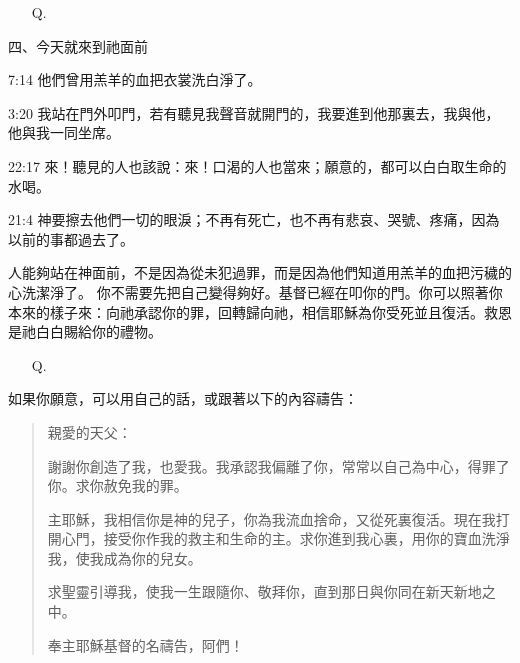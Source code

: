 \begin{center}
\begin{tcolorbox}
\begin{itemize}[leftmargin=2em, labelsep=0.3em]
\item[Q.] 
\end{itemize}

\vspace{0.3cm}
四、今天就來到祂面前

\begin{ScriptureBox}
\item[7:14] 他們曾用羔羊的血把衣裳洗白淨了。
\item[3:20] 我站在門外叩門，若有聽見我聲音就開門的，我要進到他那裏去，我與他，他與我一同坐席。
\item[22:17] 來！聽見的人也該說：來！口渴的人也當來；願意的，都可以白白取生命的水喝。
\item[21:4] 神要擦去他們一切的眼淚；不再有死亡，也不再有悲哀、哭號、疼痛，因為以前的事都過去了。
\end{ScriptureBox}

人能夠站在神面前，不是因為從未犯過罪，而是因為他們知道用羔羊的血把污穢的心洗潔淨了。
你不需要先把自己變得夠好。基督已經在叩你的門。你可以照著你本來的樣子來：向祂承認你的罪，回轉歸向祂，相信耶穌為你受死並且復活。救恩是祂白白賜給你的禮物。

\begin{itemize}[leftmargin=2em, labelsep=0.3em]
\item[Q.] 
\end{itemize}

 
如果你願意，可以用自己的話，或跟著以下的內容禱告：
 
\begin{quote}
親愛的天父：
 
謝謝你創造了我，也愛我。我承認我偏離了你，常常以自己為中心，得罪了你。求你赦免我的罪。
 
主耶穌，我相信你是神的兒子，你為我流血捨命，又從死裏復活。現在我打開心門，接受你作我的救主和生命的主。求你進到我心裏，用你的寶血洗淨我，使我成為你的兒女。
 
求聖靈引導我，使我一生跟隨你、敬拜你，直到那日與你同在新天新地之中。
 
奉主耶穌基督的名禱告，阿們！
\end{quote}

\end{tcolorbox}
\end{center}
